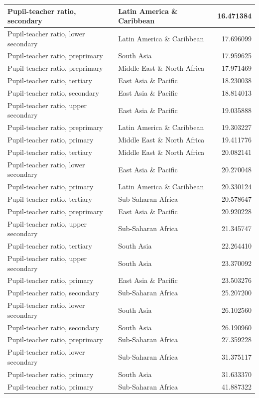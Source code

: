 \documentclass[11pt,a4paper,]{article}
\begin{document}
\begin{table}
\begin{tabular}[t]{l|l|r}
\hline
Pupil-teacher ratio, secondary & Latin America \& Caribbean & 16.471384\\
\hline
Pupil-teacher ratio, lower secondary & Latin America \& Caribbean & 17.696099\\
\hline
Pupil-teacher ratio, preprimary & South Asia & 17.959625\\
\hline
Pupil-teacher ratio, preprimary & Middle East \& North Africa & 17.971469\\
\hline
Pupil-teacher ratio, tertiary & East Asia \& Pacific & 18.230038\\
\hline
Pupil-teacher ratio, secondary & East Asia \& Pacific & 18.814013\\
\hline
Pupil-teacher ratio, upper secondary & East Asia \& Pacific & 19.035888\\
\hline
Pupil-teacher ratio, preprimary & Latin America \& Caribbean & 19.303227\\
\hline
Pupil-teacher ratio, primary & Middle East \& North Africa & 19.411776\\
\hline
Pupil-teacher ratio, tertiary & Middle East \& North Africa & 20.082141\\
\hline
Pupil-teacher ratio, lower secondary & East Asia \& Pacific & 20.270048\\
\hline
Pupil-teacher ratio, primary & Latin America \& Caribbean & 20.330124\\
\hline
Pupil-teacher ratio, tertiary & Sub-Saharan Africa & 20.578647\\
\hline
Pupil-teacher ratio, preprimary & East Asia \& Pacific & 20.920228\\
\hline
Pupil-teacher ratio, upper secondary & Sub-Saharan Africa & 21.345747\\
\hline
Pupil-teacher ratio, tertiary & South Asia & 22.264410\\
\hline
Pupil-teacher ratio, upper secondary & South Asia & 23.370092\\
\hline
Pupil-teacher ratio, primary & East Asia \& Pacific & 23.503276\\
\hline
Pupil-teacher ratio, secondary & Sub-Saharan Africa & 25.207200\\
\hline
Pupil-teacher ratio, lower secondary & South Asia & 26.102560\\
\hline
Pupil-teacher ratio, secondary & South Asia & 26.190960\\
\hline
Pupil-teacher ratio, preprimary & Sub-Saharan Africa & 27.359228\\
\hline
Pupil-teacher ratio, lower secondary & Sub-Saharan Africa & 31.375117\\
\hline
Pupil-teacher ratio, primary & South Asia & 31.633370\\
\hline
Pupil-teacher ratio, primary & Sub-Saharan Africa & 41.887322\\
\hline
\end{tabular}
\end{table}
\end{document}
